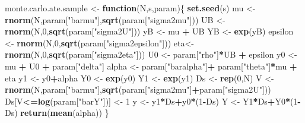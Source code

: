 \documentclass[]{book}
\newenvironment{Shaded}{\begin{snugshade}}{\end{snugshade}}
\newcommand{\KeywordTok}[1]{\textcolor[rgb]{0.13,0.29,0.53}{\textbf{#1}}}
\newcommand{\DecValTok}[1]{\textcolor[rgb]{0.00,0.00,0.81}{#1}}
\newcommand{\StringTok}[1]{\textcolor[rgb]{0.31,0.60,0.02}{#1}}
\newcommand{\ControlFlowTok}[1]{\textcolor[rgb]{0.13,0.29,0.53}{\textbf{#1}}}
\newcommand{\OperatorTok}[1]{\textcolor[rgb]{0.81,0.36,0.00}{\textbf{#1}}}
\newcommand{\NormalTok}[1]{#1}
\theoremstyle{definition}
\theoremstyle{definition}
\theoremstyle{definition}
\theoremstyle{remark}
\begin{document}
\begin{Shaded}
\begin{Highlighting}[]
\NormalTok{monte.carlo.ate.sample <-}\StringTok{ }\ControlFlowTok{function}\NormalTok{(N,s,param)\{}
  \KeywordTok{set.seed}\NormalTok{(s)}
\NormalTok{  mu <-}\StringTok{ }\KeywordTok{rnorm}\NormalTok{(N,param[}\StringTok{"barmu"}\NormalTok{],}\KeywordTok{sqrt}\NormalTok{(param[}\StringTok{"sigma2mu"}\NormalTok{]))}
\NormalTok{  UB <-}\StringTok{ }\KeywordTok{rnorm}\NormalTok{(N,}\DecValTok{0}\NormalTok{,}\KeywordTok{sqrt}\NormalTok{(param[}\StringTok{"sigma2U"}\NormalTok{]))}
\NormalTok{  yB <-}\StringTok{ }\NormalTok{mu }\OperatorTok{+}\StringTok{ }\NormalTok{UB }
\NormalTok{  YB <-}\StringTok{ }\KeywordTok{exp}\NormalTok{(yB)}
\NormalTok{  epsilon <-}\StringTok{ }\KeywordTok{rnorm}\NormalTok{(N,}\DecValTok{0}\NormalTok{,}\KeywordTok{sqrt}\NormalTok{(param[}\StringTok{"sigma2epsilon"}\NormalTok{]))}
\NormalTok{  eta<-}\StringTok{ }\KeywordTok{rnorm}\NormalTok{(N,}\DecValTok{0}\NormalTok{,}\KeywordTok{sqrt}\NormalTok{(param[}\StringTok{"sigma2eta"}\NormalTok{]))}
\NormalTok{  U0 <-}\StringTok{ }\NormalTok{param[}\StringTok{"rho"}\NormalTok{]}\OperatorTok{*}\NormalTok{UB }\OperatorTok{+}\StringTok{ }\NormalTok{epsilon}
\NormalTok{  y0 <-}\StringTok{ }\NormalTok{mu }\OperatorTok{+}\StringTok{  }\NormalTok{U0 }\OperatorTok{+}\StringTok{ }\NormalTok{param[}\StringTok{"delta"}\NormalTok{]}
\NormalTok{  alpha <-}\StringTok{ }\NormalTok{param[}\StringTok{"baralpha"}\NormalTok{]}\OperatorTok{+}\StringTok{  }\NormalTok{param[}\StringTok{"theta"}\NormalTok{]}\OperatorTok{*}\NormalTok{mu }\OperatorTok{+}\StringTok{ }\NormalTok{eta}
\NormalTok{  y1 <-}\StringTok{ }\NormalTok{y0}\OperatorTok{+}\NormalTok{alpha}
\NormalTok{  Y0 <-}\StringTok{ }\KeywordTok{exp}\NormalTok{(y0)}
\NormalTok{  Y1 <-}\StringTok{ }\KeywordTok{exp}\NormalTok{(y1)}
\NormalTok{  Ds <-}\StringTok{ }\KeywordTok{rep}\NormalTok{(}\DecValTok{0}\NormalTok{,N)}
\NormalTok{  V <-}\StringTok{ }\KeywordTok{rnorm}\NormalTok{(N,param[}\StringTok{"barmu"}\NormalTok{],}\KeywordTok{sqrt}\NormalTok{(param[}\StringTok{"sigma2mu"}\NormalTok{]}\OperatorTok{+}\NormalTok{param[}\StringTok{"sigma2U"}\NormalTok{]))}
\NormalTok{  Ds[V}\OperatorTok{<=}\KeywordTok{log}\NormalTok{(param[}\StringTok{"barY"}\NormalTok{])] <-}\StringTok{ }\DecValTok{1} 
\NormalTok{  y <-}\StringTok{ }\NormalTok{y1}\OperatorTok{*}\NormalTok{Ds}\OperatorTok{+}\NormalTok{y0}\OperatorTok{*}\NormalTok{(}\DecValTok{1}\OperatorTok{-}\NormalTok{Ds)}
\NormalTok{  Y <-}\StringTok{ }\NormalTok{Y1}\OperatorTok{*}\NormalTok{Ds}\OperatorTok{+}\NormalTok{Y0}\OperatorTok{*}\NormalTok{(}\DecValTok{1}\OperatorTok{-}\NormalTok{Ds)}
  \KeywordTok{return}\NormalTok{(}\KeywordTok{mean}\NormalTok{(alpha))}
\NormalTok{\}}


\end{Highlighting}
\end{Shaded}
\end{document}
